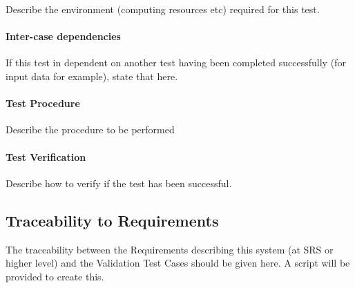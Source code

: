Describe the environment (computing resources etc) required for this test.

\paragraph{Inter-case dependencies}

If this test in dependent on another test having been completed successfully (for input data for example), state that here.

\paragraph{Test Procedure}

Describe the procedure to be performed

\paragraph{Test Verification}

Describe how to verify if the test has been successful.

\subsection{Traceability to Requirements}

The traceability between the Requirements describing this system (at SRS or higher level) and the Validation Test Cases should be given here. A script will be provided to create this.

